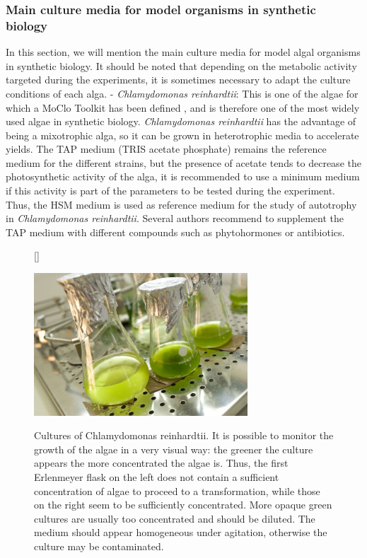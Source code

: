 \subsubsection{Main culture media for model organisms in synthetic biology}
In this section, we will mention the main culture media for model algal organisms in synthetic biology.  It should be noted that depending on the metabolic activity targeted during the experiments, it is sometimes necessary to adapt the culture conditions of each alga.
- \textit{Chlamydomonas reinhardtii}: This is one of the algae for which a MoClo Toolkit has been defined \parencite{Crozet2018}, and is therefore one of the most widely used algae in synthetic biology. \textit{Chlamydomonas reinhardtii} has the advantage of being a mixotrophic alga, so it can be grown in heterotrophic media to accelerate yields. The TAP medium (TRIS acetate phosphate) remains the reference medium for the different strains, but the presence of acetate tends to decrease the photosynthetic activity of the alga, it is recommended to use a minimum medium if this activity is part of the parameters to be tested during the experiment. Thus, the HSM medium is used as reference medium for the study of autotrophy in \textit{Chlamydomonas reinhardtii}. Several authors recommend to supplement the TAP medium with different compounds such as phytohormones or antibiotics.

\begin{figure}[!htbp]
[\FBwidth]
{\caption{Cultures of Chlamydomonas reinhardtii. It is possible to monitor the growth of the algae in a very visual way: the greener the culture appears the more concentrated the algae is. Thus, the first Erlenmeyer flask on the left does not contain a sufficient concentration of algae to proceed to a transformation, while those on the right seem to be sufficiently concentrated. More opaque green cultures are usually too concentrated and should be diluted. The medium should appear homogeneous under agitation, otherwise the culture may be contaminated.}
\label{fig:ch2alg03}}
{\includegraphics[width=8cm]{images/chap2/chap2_alg_03.png}}
\end{figure}
\FloatBarrier
\noindent

